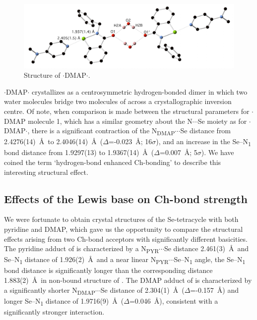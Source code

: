 \begin{refsection}
\begin{figure}
  \centering
  \includegraphics[width=0.8\linewidth]{Figures/benzyl-dmap-hydrate.pdf}
  \caption{Structure of $\cdot$DMAP$\cdot$.}
  \label{fig:benzyl-dmap-hydrate}
\end{figure}

$\cdot$DMAP$\cdot$ crystallizes as a centrosymmetric hydrogen-bonded dimer in which two water molecules bridge two molecules of  across a crystallographic inversion centre.
Of note, when comparison is made between the structural parameters for $\cdot$DMAP molecule 1, which has a similar geometry about the N$\cdots$Se moiety as for $\cdot$DMAP$\cdot$, there is a significant contraction of the N\textsubscript{DMAP}$\cdots$Se distance from 2.4276(14)~\AA\ to 2.4046(14)~\AA\ ($\Delta$=-0.023~\AA ; 16$\sigma$), and an increase in the Se--N\textsubscript{1} bond distance from 1.9297(13) to 1.9367(14)~\AA\ ($\Delta$=0.007~\AA ; 5$\sigma$).
We have coined the term `hydrogen-bond enhanced Ch-bonding' to describe this interesting structural effect.

\subsection{Effects of the Lewis base on Ch-bond strength}
We were fortunate to obtain crystal structures of the Se-tetracycle  with both pyridine and DMAP, which gave us the opportunity to compare the structural effects arising from two Ch-bond acceptors with significantly different basicities.
The pyridine adduct of  is characterized by a N\textsubscript{PYR}$\cdots$Se distance 2.461(3)~\AA\ and Se--N\textsubscript{1} distance of 1.926(2)~\AA\ and a near linear N\textsubscript{PYR}$\cdots$Se--N\textsubscript{1} angle, the Se--N\textsubscript{1} bond distance is significantly longer than the corresponding distance 1.883(2)~\AA\ in non-bound structure of .
The DMAP adduct of  is characterized by a significantly shorter N\textsubscript{DMAP}$\cdots$Se distance of 2.304(1)~\AA\ ($\Delta$=-0.157~\AA) and longer Se--N\textsubscript{1} distance of 1.9716(9)~\AA\ ($\Delta$=0.046~\AA), consistent with a significantly stronger interaction.


\end{refsection}
